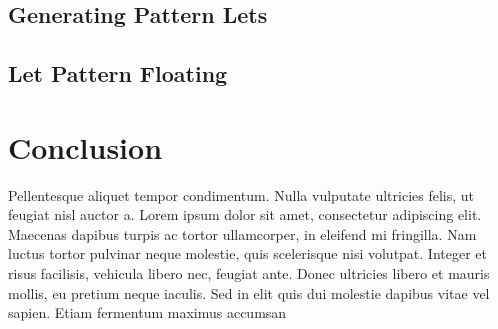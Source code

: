 \subsection{Generating Pattern Lets}

\subsection{Let Pattern Floating}

\section{Conclusion}
\label{sec:main_conclusion}

Pellentesque aliquet tempor condimentum. Nulla vulputate ultricies felis, ut feugiat nisl auctor a. Lorem ipsum dolor sit amet, consectetur adipiscing elit. Maecenas dapibus turpis ac tortor ullamcorper, in eleifend mi fringilla. Nam luctus tortor pulvinar neque molestie, quis scelerisque nisi volutpat. Integer et risus facilisis, vehicula libero nec, feugiat ante. Donec ultricies libero et mauris mollis, eu pretium neque iaculis. Sed in elit quis dui molestie dapibus vitae vel sapien. Etiam fermentum maximus accumsan

